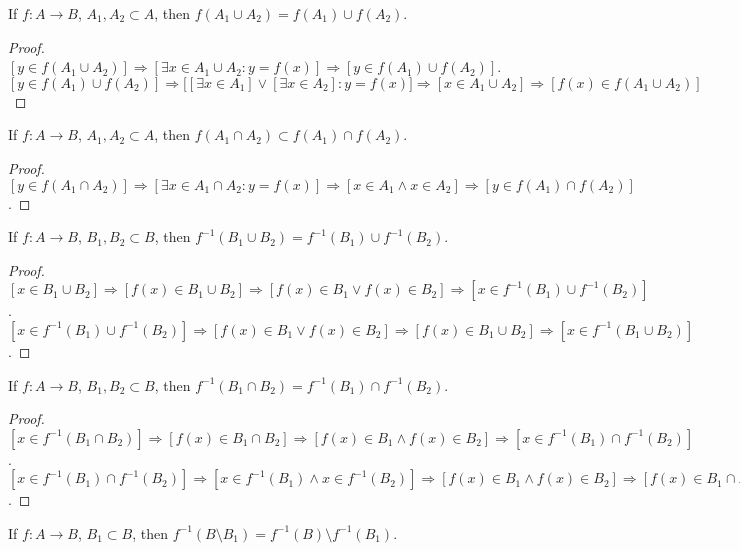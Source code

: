 \documentclass[crop=false,class=article,oneside]{standalone}
\begin{document}
        \begin{theorem}
        If $f:A\rightarrow B$, $A_1,A_2\subset A$, then $f(A_1 \cup A_2) = f(A_1)\cup f(A_2)$.
        \end{theorem}
        \begin{proof}
        $[y\in f(A_1\cup A_2)]\Rightarrow [\exists x\in A_1 \cup A_2:y=f(x)]\Rightarrow [y \in f(A_1)\cup f(A_2)]$. $[y\in f(A_1)\cup f(A_2)]\Rightarrow \big[[\exists x\in A_1] \lor [\exists x\in A_2]: y=f(x)\big]\Rightarrow [x\in A_1\cup A_2]\Rightarrow [f(x)\in f(A_1\cup A_2)]$
        \end{proof}
        \begin{theorem}
        If $f:A\rightarrow B$, $A_1,A_2\subset A$, then $f(A_1\cap A_2)\subset f(A_1)\cap f(A_2)$.
        \end{theorem}
        \begin{proof}
        $[y\in f(A_1 \cap A_2)]\Rightarrow [\exists x\in A_1 \cap A_2:y=f(x)]\Rightarrow [x\in A_1 \land x \in A_2] \Rightarrow[y \in f(A_1)\cap f(A_2)]$.
        \end{proof}
        \begin{theorem}
        If $f:A\rightarrow B$, $B_1,B_2\subset B$, then $f^{-1}(B_1\cup B_2) = f^{-1}(B_1)\cup f^{-1}(B_2)$.
        \end{theorem}
        \begin{proof}
        $[x\in B_1\cup B_2]\Rightarrow [f(x)\in B_1\cup B_2]\Rightarrow [f(x)\in B_1\lor f(x)\in B_2]\Rightarrow [x\in f^{-1}(B_1)\cup f^{-1}(B_2)]$. $[x \in f^{-1}(B_1)\cup f^{-1}(B_2)]\Rightarrow [f(x)\in B_1\lor f(x) \in B_2]\Rightarrow [f(x) \in B_1\cup B_2]\Rightarrow [x\in f^{-1}(B_1\cup B_2)]$.
        \end{proof}
        \begin{theorem}
        If $f:A\rightarrow B$, $B_1,B_2\subset B$, then $f^{-1}(B_1\cap B_2) = f^{-1}(B_1)\cap f^{-1}(B_2)$.
        \end{theorem}
        \begin{proof}
        $[x\in f^{-1}(B_1\cap B_2)]\Rightarrow [f(x) \in B_1 \cap B_2]\Rightarrow [f(x)\in B_1\land f(x) \in B_2 ]\Rightarrow [x\in f^{-1}(B_1)\cap f^{-1}(B_2)]$. $[x\in f^{-1}(B_1)\cap f^{-1}(B_2)]\Rightarrow [x\in f^{-1}(B_1)\land x\in f^{-1}(B_2)]\Rightarrow [f(x) \in B_1\land f(x) \in B_2]\Rightarrow [f(x)\in B_1\cap B_2]\Rightarrow [x\in f^{-1}(B_1\cap B_2)]$.
        \end{proof}
        \begin{theorem}
        If $f:A\rightarrow B$, $B_1 \subset B$, then $f^{-1}(B\setminus B_1) = f^{-1}(B)\setminus f^{-1}(B_1)$.
        \end{theorem}
\end{document}
